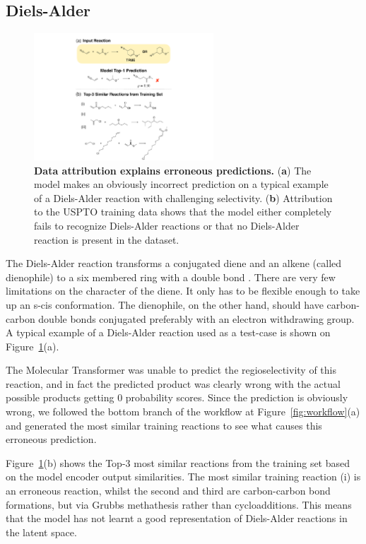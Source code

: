 \subsection{Diels-Alder}

\begin{figure}[ht!]
    \centering
    \includegraphics[width=0.6\textwidth]{Chapters/Transformer/Figs/diels_alder.pdf}
    \caption{\label{fig:diels_alder} \textbf{Data attribution explains erroneous predictions.} (\textbf{a}) The model makes an obviously incorrect prediction on a typical example of a Diels-Alder reaction with challenging selectivity. (\textbf{b}) Attribution to the USPTO training data shows that the model either completely fails to recognize Diels-Alder reactions or that no Diels-Alder reaction is present in the dataset.}
\end{figure}

The Diels-Alder reaction transforms a conjugated diene and an alkene (called dienophile) to a six membered ring with a double bond \cite{Clayden2012}. There are very few limitations on the character of the diene. It only has to be flexible enough to take up an s-cis conformation. The dienophile, on the other hand, should have carbon-carbon double bonds conjugated preferably with an electron withdrawing group. A typical example of a Diels-Alder reaction used as a test-case is shown on Figure~\ref{fig:diels_alder}(a). 

The Molecular Transformer was unable to predict the regioselectivity of this reaction, and in fact the predicted product was clearly wrong with the actual possible products getting 0 probability scores. Since the prediction is obviously wrong, we followed the bottom branch of the workflow at Figure~\ref{fig:workflow}(a) and generated the most similar training reactions to see what causes this erroneous prediction.

Figure~\ref{fig:diels_alder}(b) shows the Top-3 most similar reactions from the training set based on the model encoder output similarities. The most similar training reaction (i) is an erroneous reaction, whilst the second and third are carbon-carbon bond formations, but via Grubbs methathesis \cite{grubbs} rather than cycloadditions. This means that the model has not learnt a good representation of Diels-Alder reactions in the latent space. 

